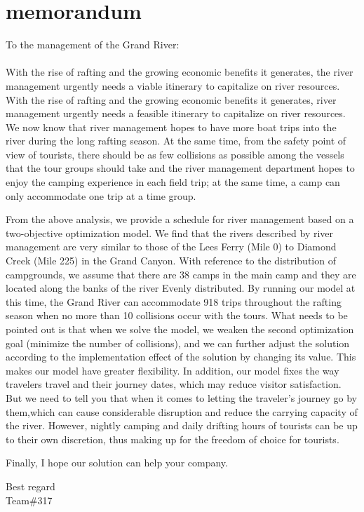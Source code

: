 \newpage
\section{memorandum}
\noindent
To the management of the Grand River:\\
\\
\noindent
With the rise of rafting and the growing economic benefits it generates, the river management urgently needs a viable itinerary to capitalize on river resources. With the rise of rafting and the growing economic benefits it generates, river management urgently needs a feasible itinerary to capitalize on river resources. We now know that river management hopes to have more boat trips into the river during the long rafting season. At the same time, from the safety point of view of tourists, there should be as few collisions as possible among the vessels that the tour groups should take and the river management department hopes to enjoy the camping experience in each field trip; at the same time, a camp can only accommodate one trip at a time group.
\par From the above analysis, we provide a schedule for river management based on a two-objective optimization model. We find that the rivers described by river management are very similar to those of the Lees Ferry (Mile 0) to Diamond Creek (Mile 225) in the Grand Canyon. With reference to the distribution of campgrounds, we assume that there are 38 camps in the main camp and they are located along the banks of the river Evenly distributed. By running our model at this time, the Grand River can accommodate 918 trips throughout the rafting season when no more than 10 collisions occur with the tours. What needs to be pointed out is that when we solve the model, we weaken the second optimization goal (minimize the number of collisions), and we can further adjust the solution according to the implementation effect of the solution by changing its value. This makes our model have greater flexibility. In addition, our model fixes the way travelers travel and their journey dates, which may reduce visitor satisfaction. But we need to tell you that when it comes to letting the traveler's journey go by them,which can cause considerable disruption and reduce the carrying capacity of the river. However, nightly camping and daily drifting hours of tourists can be up to their own discretion, thus making up for the freedom of choice for tourists.
\par Finally, I hope our solution can help your company.
\begin{flushright}
 	Best regard\\
	Team\#317
\end{flushright}